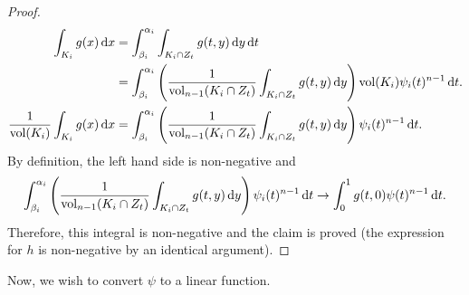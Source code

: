 \begin{proof}
\begin{align*}
		\int_{K_i} g(x)\d{x} &= \int_{\beta_i}^{\alpha_i} \int_{K_i\cap Z_t} g(t,y)\d{y}\d{t} \\
			&= \int_{\beta_i}^{\alpha_i} \left( \frac{1}{\vol_{n-1}(K_i\cap Z_t)} \int_{K_i\cap Z_t} g(t,y)\d{y} \right) \vol(K_i) \psi_i(t)^{n-1} \d{t}. \\
		\frac{1}{\vol(K_i)}\int_{K_i} g(x)\d{x} &= \int_{\beta_i}^{\alpha_i} \left( \frac{1}{\vol_{n-1}(K_i\cap Z_t)} \int_{K_i\cap Z_t} g(t,y)\d{y} \right) \psi_i(t)^{n-1} \d{t}.
	\end{align*}
	By definition, the left hand side is non-negative and
	\[ \int_{\beta_i}^{\alpha_i} \left( \frac{1}{\operatorname{vol}_{n-1}(K_i\cap Z_t)} \int_{K_i\cap Z_t} g(t,y)\operatorname{d}\!{y} \right) \psi_i(t)^{n-1} \operatorname{d}\!{t} \to \int_0^1 g(t,0)\psi(t)^{n-1}\operatorname{d}\!{t}. \]
	Therefore, this integral is non-negative and the claim is proved (the expression for $h$ is non-negative by an identical argument).
\end{proof}

Now, we wish to convert $\psi$ to a linear function.

